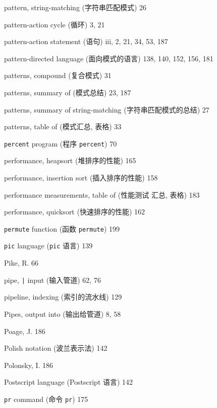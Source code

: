 \begin{multicols}{2}
\hangindent=2pc  pattern, string-matching (字符串匹配模式) 26

\hangindent=2pc  pattern-action cycle (\patact 循环) 3, 21

\hangindent=2pc  pattern-action statement (\patact 语句)
iii, 2, 21, 34, 53, 187

\hangindent=2pc  pattern-directed language (面向模式的语言)
138,  140, 152, 156, 181

\hangindent=2pc  patterns, compound (复合模式) 31

\hangindent=2pc  patterns, summary of (模式总结) 23, 187

\hangindent=2pc  patterns, summary of string-matching
(字符串匹配模式的总结) 27

\hangindent=2pc  patterns, table of (模式汇总, 表格) 33

\hangindent=2pc  \verb'percent' program (程序 \verb'percent') 70

\hangindent=2pc  performance, heapsort (堆排序的性能) 165

\hangindent=2pc  performance, insertion sort (插入排序的性能) 158

\hangindent=2pc  performance measurements, table of (性能测试
汇总, 表格) 183

\hangindent=2pc  performance, quicksort (快速排序的性能) 162

\hangindent=2pc  \verb'permute' function (函数 \verb'permute') 199

\hangindent=2pc  \verb'pic' language (\verb'pic' 语言) 139

\hangindent=2pc  Pike, R. 66

\hangindent=2pc  pipe, \verb'|' input (输入管道) 62, 76

\hangindent=2pc  pipeline, indexing (索引的流水线) 129

\hangindent=2pc  Pipes, output into (输出给管道) 8, 58

\hangindent=2pc  Poage, J. 186

\hangindent=2pc  Polish notation (波兰表示法) 142

\hangindent=2pc  Polonsky, I. 186

\hangindent=2pc  Postscript language (Postscript 语言) 142

\hangindent=2pc  \verb'pr' command (命令 \verb'pr') 175


\end{multicols}
